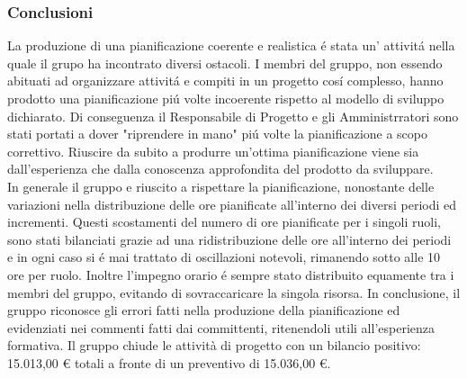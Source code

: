 \subsubsection{Conclusioni}
La produzione di una pianificazione coerente e realistica é stata un' attivitá nella quale il grupo ha incontrato diversi ostacoli. I membri del gruppo, non essendo abituati ad organizzare attivitá e compiti in un progetto cosí complesso, hanno prodotto una pianificazione piú volte incoerente rispetto al modello di sviluppo dichiarato. Di conseguenza il Responsabile di Progetto e gli Amministrratori sono stati portati a dover "riprendere in mano" piú volte la pianificazione a scopo correttivo. Riuscire da subito a produrre un'ottima pianificazione viene sia dall'esperienza che dalla conoscenza approfondita del prodotto da sviluppare.\\
In generale il gruppo e riuscito a rispettare la pianificazione, nonostante delle variazioni nella distribuzione delle ore pianificate all'interno dei diversi periodi ed incrementi. Questi scostamenti del numero di ore pianificate per i singoli ruoli, sono stati bilanciati grazie ad una ridistribuzione delle ore all'interno dei periodi e in ogni caso si é mai trattato di oscillazioni notevoli, rimanendo sotto alle 10 ore per ruolo. Inoltre l'impegno orario é sempre stato distribuito equamente tra i membri del gruppo, evitando di sovraccaricare la singola risorsa.
\newline
\newline
In conclusione, il gruppo riconosce gli errori fatti nella produzione della pianificazione ed evidenziati nei commenti fatti dai committenti, ritenendoli utili all'esperienza formativa.
\newline
\newline
Il gruppo chiude le attività di progetto con un bilancio positivo: 15.013,00 \euro{} totali a fronte di un preventivo di 15.036,00 \euro{}.
